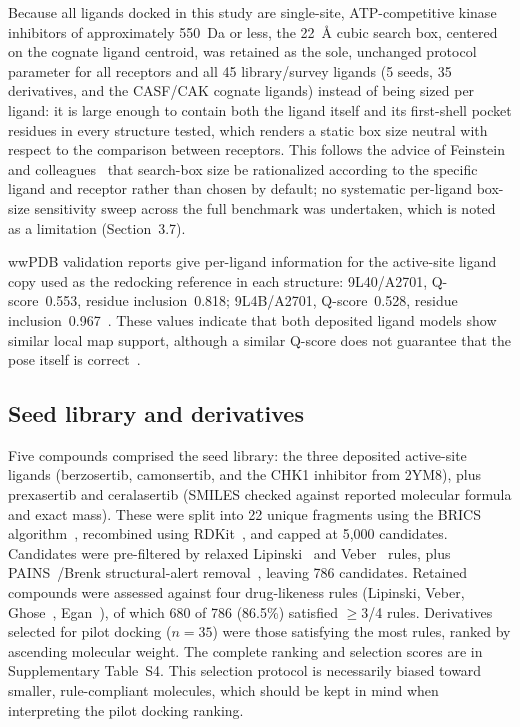 \documentclass[global,twocolumn]{svjour}
\begin{document}
Because all ligands docked in this study are single-site, ATP-competitive
kinase inhibitors of approximately 550~Da or less, the 22~\AA{} cubic
search box, centered on the cognate ligand centroid, was retained as the
sole, unchanged protocol parameter for all receptors and all 45
library/survey ligands (5 seeds, 35 derivatives, and the CASF/CAK cognate
ligands) instead of being sized per ligand: it is large enough to contain
both the ligand itself and its first-shell pocket residues in every
structure tested, which renders a static box size neutral with respect to
the comparison between receptors. This follows the advice of Feinstein and
colleagues~\cite{feinstein2021} that search-box size be rationalized
according to the specific ligand and receptor rather than chosen by
default; no systematic per-ligand box-size sensitivity sweep across the
full benchmark was undertaken, which is noted as a limitation
(Section~3.7).

wwPDB validation reports give per-ligand information for the active-site
ligand copy used as the redocking reference in each structure: 9L40/A2701,
Q-score~0.553, residue inclusion~0.818; 9L4B/A2701, Q-score~0.528, residue
inclusion~0.967~\cite{pintilie2020}. These values indicate that both
deposited ligand models show similar local map support, although a similar
Q-score does not guarantee that the pose itself is
correct~\cite{pintilie2020}.

\subsection{Seed library and derivatives}

Five compounds comprised the seed library: the three deposited active-site
ligands (berzosertib, camonsertib, and the CHK1 inhibitor from 2YM8), plus
prexasertib and ceralasertib (SMILES checked against reported molecular
formula and exact mass). These were split into 22 unique fragments using
the BRICS algorithm~\cite{degen2008}, recombined using RDKit~\cite{rdkit},
and capped at 5,000 candidates. Candidates were pre-filtered by relaxed
Lipinski~\cite{lipinski1997} and Veber~\cite{veber2002} rules, plus
PAINS~\cite{baell2010}/Brenk structural-alert removal~\cite{brenk2008},
leaving 786 candidates. Retained compounds were assessed against four
drug-likeness rules (Lipinski, Veber, Ghose~\cite{ghose1999},
Egan~\cite{egan2000}), of which 680 of 786 (86.5\%) satisfied $\ge$3/4
rules. Derivatives selected for pilot docking ($n=35$) were those
satisfying the most rules, ranked by ascending molecular weight. The
complete ranking and selection scores are in Supplementary Table~S4. This
selection protocol is necessarily biased toward smaller, rule-compliant
molecules, which should be kept in mind when interpreting the pilot docking
ranking.
\end{document}
